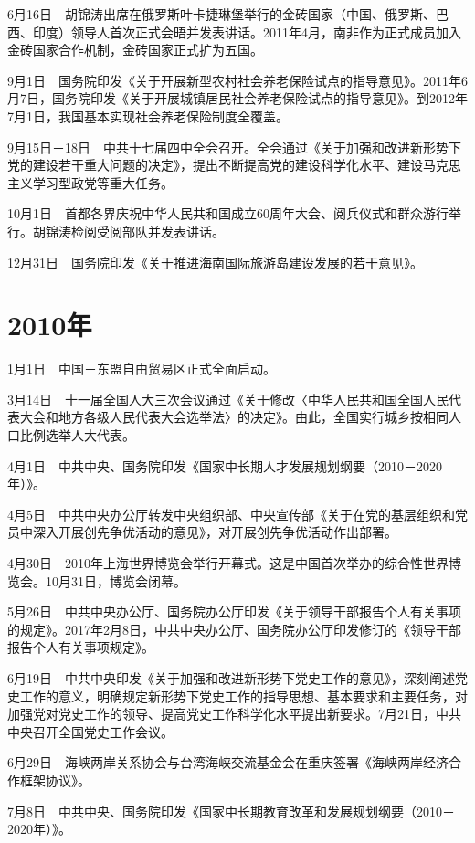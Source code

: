 \documentclass[10pt,a4paper,twocolumn]{book}
\begin{document}
6月16日　胡锦涛出席在俄罗斯叶卡捷琳堡举行的金砖国家（中国、俄罗斯、巴西、印度）领导人首次正式会晤并发表讲话。2011年4月，南非作为正式成员加入金砖国家合作机制，金砖国家正式扩为五国。

9月1日　国务院印发《关于开展新型农村社会养老保险试点的指导意见》。2011年6月7日，国务院印发《关于开展城镇居民社会养老保险试点的指导意见》。到2012年7月1日，我国基本实现社会养老保险制度全覆盖。

9月15日－18日　中共十七届四中全会召开。全会通过《关于加强和改进新形势下党的建设若干重大问题的决定》，提出不断提高党的建设科学化水平、建设马克思主义学习型政党等重大任务。

10月1日　首都各界庆祝中华人民共和国成立60周年大会、阅兵仪式和群众游行举行。胡锦涛检阅受阅部队并发表讲话。

12月31日　国务院印发《关于推进海南国际旅游岛建设发展的若干意见》。

\section{2010年}

1月1日　中国－东盟自由贸易区正式全面启动。

3月14日　十一届全国人大三次会议通过《关于修改〈中华人民共和国全国人民代表大会和地方各级人民代表大会选举法〉的决定》。由此，全国实行城乡按相同人口比例选举人大代表。

4月1日　中共中央、国务院印发《国家中长期人才发展规划纲要（2010－2020年）》。

4月5日　中共中央办公厅转发中央组织部、中央宣传部《关于在党的基层组织和党员中深入开展创先争优活动的意见》，对开展创先争优活动作出部署。

4月30日　2010年上海世界博览会举行开幕式。这是中国首次举办的综合性世界博览会。10月31日，博览会闭幕。

5月26日　中共中央办公厅、国务院办公厅印发《关于领导干部报告个人有关事项的规定》。2017年2月8日，中共中央办公厅、国务院办公厅印发修订的《领导干部报告个人有关事项规定》。

6月19日　中共中央印发《关于加强和改进新形势下党史工作的意见》，深刻阐述党史工作的意义，明确规定新形势下党史工作的指导思想、基本要求和主要任务，对加强党对党史工作的领导、提高党史工作科学化水平提出新要求。7月21日，中共中央召开全国党史工作会议。

6月29日　海峡两岸关系协会与台湾海峡交流基金会在重庆签署《海峡两岸经济合作框架协议》。

7月8日　中共中央、国务院印发《国家中长期教育改革和发展规划纲要（2010－2020年）》。
\end{document}
